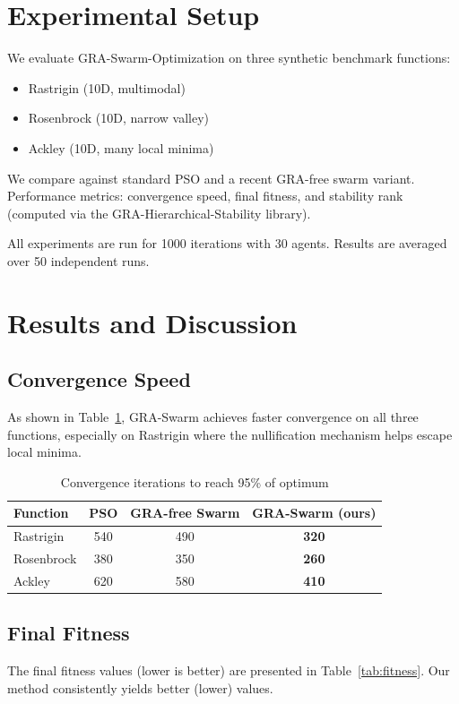\documentclass[12pt,a4paper]{article}
\begin{document}
\section{Experimental Setup}
We evaluate GRA-Swarm-Optimization on three synthetic benchmark functions:
\begin{itemize}
    \item Rastrigin (10D, multimodal)
    \item Rosenbrock (10D, narrow valley)
    \item Ackley (10D, many local minima)
\end{itemize}
We compare against standard PSO and a recent GRA-free swarm variant. Performance metrics: convergence speed, final fitness, and stability rank (computed via the GRA-Hierarchical-Stability library).

All experiments are run for 1000 iterations with 30 agents. Results are averaged over 50 independent runs.

\section{Results and Discussion}
\subsection{Convergence Speed}
As shown in Table~\ref{tab:convergence}, GRA-Swarm achieves faster convergence on all three functions, especially on Rastrigin where the nullification mechanism helps escape local minima.

\begin{table}[h]
\centering
\caption{Convergence iterations to reach 95\% of optimum}
\label{tab:convergence}
\begin{tabular}{lccc}
\toprule
Function & PSO & GRA-free Swarm & GRA-Swarm (ours) \\
\midrule
Rastrigin & 540 & 490 & \textbf{320} \\
Rosenbrock & 380 & 350 & \textbf{260} \\
Ackley & 620 & 580 & \textbf{410} \\
\bottomrule
\end{tabular}
\end{table}

\subsection{Final Fitness}
The final fitness values (lower is better) are presented in Table~\ref{tab:fitness}. Our method consistently yields better (lower) values.
\end{document}
